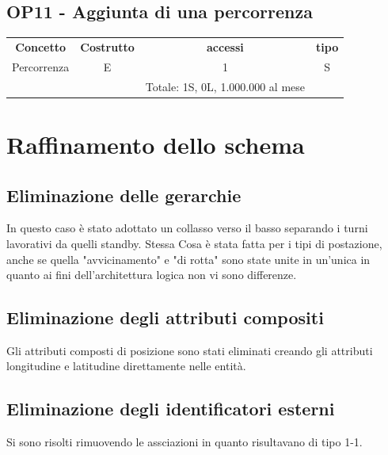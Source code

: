     \subsection*{OP11 - Aggiunta di una percorrenza}
    \begin{table}[H]
    \centering
    \begin{tabular}{cccc}
  
    \rowcolor{tableheadercolor}
    \textbf{Concetto} & \textbf{Costrutto} & \textbf{accessi} & \textbf{tipo}\\
  
    Percorrenza & E & 1 & S \\\
    & & Totale: 1S, 0L, 1.000.000 al mese &\\
  
    \end{tabular}
    \end{table}
  
\section{Raffinamento dello schema}
\subsection*{Eliminazione delle gerarchie}
In questo caso è stato adottato un collasso verso il basso separando i turni lavorativi da quelli standby. 
Stessa Cosa è stata fatta per i tipi di postazione, anche se quella "avvicinamento" e "di rotta" sono state unite in un'unica in quanto ai fini dell'architettura logica non vi sono differenze.


\subsection*{Eliminazione degli attributi compositi}
Gli attributi composti di posizione sono stati eliminati creando gli attributi longitudine e latitudine direttamente nelle entità.
\subsection*{Eliminazione degli identificatori esterni}
Si sono risolti rimuovendo le assciazioni in quanto risultavano di tipo 1-1.

